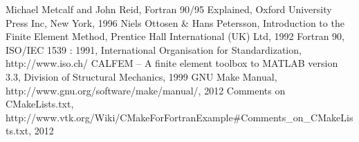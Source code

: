 \begin{thebibliography}{}
 Michael Metcalf and John Reid, Fortran 90/95 Explained, Oxford University Press Inc, New York, 1996
 Niels Ottosen \& Hans Petersson, Introduction to the Finite Element Method, Prentice Hall International (UK) Ltd, 1992
 Fortran 90, ISO/IEC 1539 : 1991, International Organisation for Standardization, http://www.iso.ch/
 CALFEM -- A finite element toolbox to MATLAB version 3.3, Division of Structural Mechanics, 1999
 GNU Make Manual, http://www.gnu.org/software/make/manual/, 2012
 Comments on CMakeLists.txt, http://www.vtk.org/Wiki/CMakeForFortranExample\#Comments\_on\_CMakeLists.txt, 2012
\end{thebibliography}
